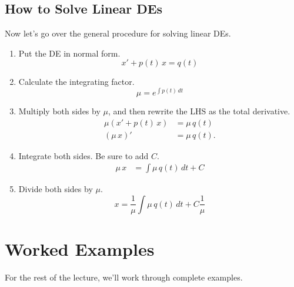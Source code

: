 \documentclass[10pt,letterpaper]{article}
\begin{document}
\subsection{How to Solve Linear DEs}
Now let's go over the general procedure for solving linear DEs.
\begin{enumerate}
    \item Put the DE in normal form.
    $$x' + p(t)\,x =q(t)$$
    \item Calculate the integrating factor.
    $$
        \mu = e^{\int p(t) \,dt}
    $$
    \item Multiply both sides by $\mu$, and then rewrite the LHS as the total derivative.
    \begin{align*}    
    \mu (x' + p(t)\,x) &=\mu \,q(t) \\
    (\mu\,x)' &=\mu \,q(t). 
    \end{align*}
    \item Integrate both sides. Be sure to add $C$.
    \begin{align*}    
        \mu\,x &= \int \mu \,q(t)\,dt +C 
    \end{align*}
    \item Divide both sides by $\mu$. 
    $$
        x = \frac{1}{\mu}\int \mu \,q(t)\,dt +C \frac{1}{\mu} 
    $$
    
\end{enumerate}

\section{Worked Examples}
For the rest of the lecture, we'll work through complete examples.
\end{document}

